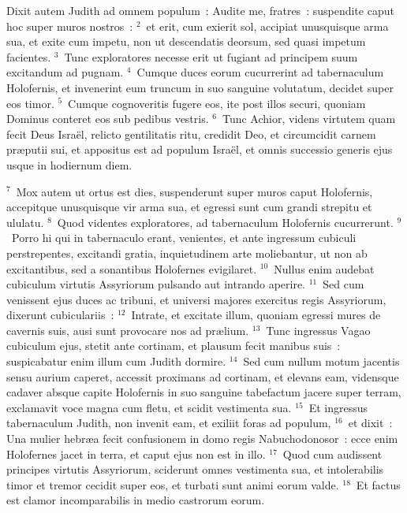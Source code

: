 \lettrine[lines=3,image=true,loversize=0.05,lraise=-0.03]{D}{}ixit autem Judith ad omnem populum~: Audite me, fratres~: suspendite caput hoc super muros nostros~:
${}^{2}$~et erit, cum exierit sol, accipiat unusquisque arma sua, et exite cum impetu, non ut descendatis deorsum, sed quasi impetum facientes.
${}^{3}$~Tunc exploratores necesse erit ut fugiant ad principem suum excitandum ad pugnam.
${}^{4}$~Cumque duces eorum cucurrerint ad tabernaculum Holofernis, et invenerint eum truncum in suo sanguine volutatum, decidet super eos timor.
${}^{5}$~Cumque cognoveritis fugere eos, ite post illos securi, quoniam Dominus conteret eos sub pedibus vestris.
${}^{6}$~Tunc Achior, videns virtutem quam fecit Deus Isra\"el, relicto gentilitatis ritu, credidit Deo, et circumcidit carnem pr\ae putii sui, et appositus est ad populum Isra\"el, et omnis successio generis ejus usque in hodiernum diem.


${}^{7}$~Mox autem ut ortus est dies, suspenderunt super muros caput Holofernis, accepitque unusquisque vir arma sua, et egressi sunt cum grandi strepitu et ululatu.
${}^{8}$~Quod videntes exploratores, ad tabernaculum Holofernis cucurrerunt.
${}^{9}$~Porro hi qui in tabernaculo erant, venientes, et ante ingressum cubiculi perstrepentes, excitandi gratia, inquietudinem arte moliebantur, ut non ab excitantibus, sed a sonantibus Holofernes evigilaret.
${}^{10}$~Nullus enim audebat cubiculum virtutis Assyriorum pulsando aut intrando aperire.
${}^{11}$~Sed cum venissent ejus duces ac tribuni, et universi majores exercitus regis Assyriorum, dixerunt cubiculariis~:
${}^{12}$~Intrate, et excitate illum, quoniam egressi mures de cavernis suis, ausi sunt provocare nos ad pr\ae lium.
${}^{13}$~Tunc ingressus Vagao cubiculum ejus, stetit ante cortinam, et plausum fecit manibus suis~: suspicabatur enim illum cum Judith dormire.
${}^{14}$~Sed cum nullum motum jacentis sensu aurium caperet, accessit proximans ad cortinam, et elevans eam, vidensque cadaver absque capite Holofernis in suo sanguine tabefactum jacere super terram, exclamavit voce magna cum fletu, et scidit vestimenta sua.
${}^{15}$~Et ingressus tabernaculum Judith, non invenit eam, et exiliit foras ad populum,
${}^{16}$~et dixit~: Una mulier hebr\ae a fecit confusionem in domo regis Nabuchodonosor~: ecce enim Holofernes jacet in terra, et caput ejus non est in illo.
${}^{17}$~Quod cum audissent principes virtutis Assyriorum, sciderunt omnes vestimenta sua, et intolerabilis timor et tremor cecidit super eos, et turbati sunt animi eorum valde.
${}^{18}$~Et factus est clamor incomparabilis in medio castrorum eorum.

